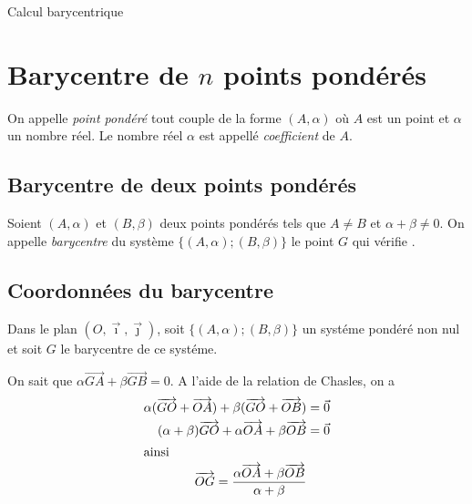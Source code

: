 
\TCDLessonStyleOn
\providecommand{\D}{\mathcal{D}}

\begin{chapter}{Calcul barycentrique}
\section{Barycentre de $n$ points pond\'er\'es}

\begin{defi}
On appelle \emph{point pond\'er\'e} tout couple de la forme $(A,\alpha)$ o\`u $A$ est un point et $\alpha$ un nombre r\'eel.
Le nombre r\'eel $\alpha$ est appell\'e \emph{coefficient} de $A$.
\end{defi}

\subsection{Barycentre de deux points pond\'er\'es}
Soient $(A,\alpha)$ et $(B,\beta)$ deux points pond\'er\'es tels que $A \neq B$ et $\alpha + \beta \neq 0$.
On appelle \emph{barycentre} du syst\`eme $\{ (A,\alpha) ; (B,\beta) \}$ le point $G$ qui v\'erifie 
.

\subsection{Coordonn\'ees du barycentre}
Dans le plan $(O, \vec{\imath} , \vec{\jmath})$, soit $\{ (A,\alpha) ; (B,\beta) \}$ un syst\'eme pond\'er\'e non nul et soit $G$ le barycentre de ce syst\'eme.

On sait que $ \alpha \overrightarrow{GA} + \beta \overrightarrow{GB} = 0$.
A l'aide de la relation de Chasles, on a
\begin{align*}
\alpha ( \overrightarrow{GO} + \overrightarrow{OA} ) + \beta ( \overrightarrow{GO} + \overrightarrow{OB} ) & = \vec{0} \\
(\alpha + \beta) \overrightarrow{GO} + \alpha \overrightarrow{OA} + \beta \overrightarrow{OB} & = \vec{0} \\
\intertext{ainsi}
\overrightarrow{OG} = \frac{\alpha \overrightarrow{OA} + \beta \overrightarrow{OB}}{\alpha + \beta} \label{eq:barycentre coordonnees vecteurs}
\end{align*}


\end{chapter}
